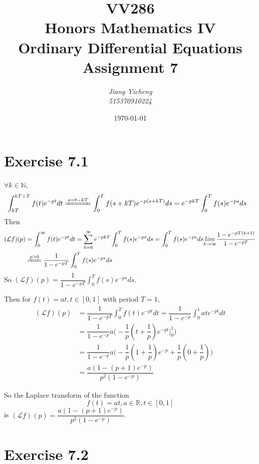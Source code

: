 \documentclass[a4paper,12pt,titlepage]{article}
\author{\textit{Jiang Yicheng}\\\textit{515370910224}}
\title{\textbf{VV286\\ Honors Mathematics IV\\
Ordinary Differential Equations\\
		Assignment 7}}
\date{\today}
\begin{document}
\maketitle

\section*{Exercise 7.1}
$\forall k\in\mathbb{N}$, 
\begin{align*}
&\int_{kT}^{kT+T}f(t)e^{-pt}dt\xlongequal {s=t-kT}\int_{0}^{T}f(s+kT)e^{-p(s+kT)}ds=e^{-pkT}\int_{0}^{T}f(s)e^{-ps}ds
\end{align*}
Then 
\begin{align*}
(\mathcal{L}f)(p)&=\int_{0}^{\infty}f(t)e^{-pt}dt=\sum\limits_{k=0}^{\infty}e^{-pkT}\int_{0}^{T}f(s)e^{-ps}ds=\int_{0}^{T}f(s)e^{-ps}ds\underset{k\rightarrow \infty}{lim}\dfrac{1-e^{-pT(k+1)}}{1-e^{-pT}}\\
&\xlongequal {p>0}\dfrac{1}{1-e^{-pT}}\int_{0}^{T}f(s)e^{-ps}ds
\end{align*}
So $(\mathcal{L}f)(p)=\dfrac{1}{1-e^{-pT}}\int_{0}^{T}f(s)e^{-ps}ds$.

Then for $f(t)=at,t\in[0,1]$ with period $T=1$,
\begin{align*}
(\mathcal{L}f)(p)&=\dfrac{1}{1-e^{-pT}}\int_{0}^{T}f(t)e^{-pt}dt=\dfrac{1}{1-e^{-p}}\int_{0}^{1}ate^{-pt}dt\\
&=\dfrac{1}{1-e^{-p}}a\Big(-\dfrac{1}{p}(t+\dfrac{1}{p})e^{-pt}|_{0}^{1}\Big)\\
&=\dfrac{1}{1-e^{-p}}a\Big(-\dfrac{1}{p}(1+\dfrac{1}{p})e^{-p}+\dfrac{1}{p}(0+\dfrac{1}{p})\Big)\\
&=\dfrac{a(1-(p+1)e^{-p})}{p^2(1-e^{-p})}
\end{align*}

So the Laplace transform of the function
$$f(t) = at, a \in \mathbb{R}, t \in [0, 1]$$
is $(\mathcal{L}f)(p)=\dfrac{a(1-(p+1)e^{-p})}{p^2(1-e^{-p})}$.

\section*{Exercise 7.2}
\end{document}
